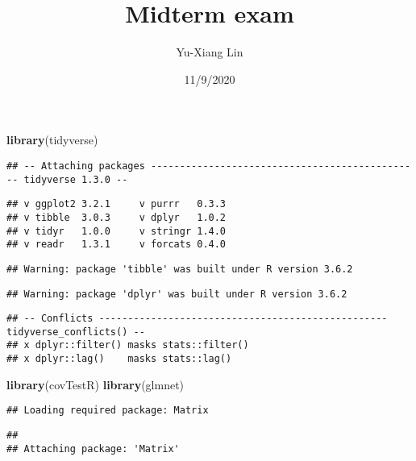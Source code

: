 \documentclass[]{article}
\title{Midterm exam}
\author{Yu-Xiang Lin}
\date{11/9/2020}
\newenvironment{Shaded}{\begin{snugshade}}{\end{snugshade}}
\newcommand{\KeywordTok}[1]{\textcolor[rgb]{0.13,0.29,0.53}{\textbf{#1}}}
\newcommand{\NormalTok}[1]{#1}
\begin{document}
\maketitle

{
\setcounter{tocdepth}{4}
\tableofcontents
}
\begin{Shaded}
\begin{Highlighting}[]
\KeywordTok{library}\NormalTok{(tidyverse)}
\end{Highlighting}
\end{Shaded}

\begin{verbatim}
## -- Attaching packages ----------------------------------------------- tidyverse 1.3.0 --
\end{verbatim}

\begin{verbatim}
## v ggplot2 3.2.1     v purrr   0.3.3
## v tibble  3.0.3     v dplyr   1.0.2
## v tidyr   1.0.0     v stringr 1.4.0
## v readr   1.3.1     v forcats 0.4.0
\end{verbatim}

\begin{verbatim}
## Warning: package 'tibble' was built under R version 3.6.2
\end{verbatim}

\begin{verbatim}
## Warning: package 'dplyr' was built under R version 3.6.2
\end{verbatim}

\begin{verbatim}
## -- Conflicts -------------------------------------------------- tidyverse_conflicts() --
## x dplyr::filter() masks stats::filter()
## x dplyr::lag()    masks stats::lag()
\end{verbatim}

\begin{Shaded}
\begin{Highlighting}[]
\KeywordTok{library}\NormalTok{(covTestR)}
\KeywordTok{library}\NormalTok{(glmnet)}
\end{Highlighting}
\end{Shaded}

\begin{verbatim}
## Loading required package: Matrix
\end{verbatim}

\begin{verbatim}
## 
## Attaching package: 'Matrix'
\end{verbatim}
\end{document}
